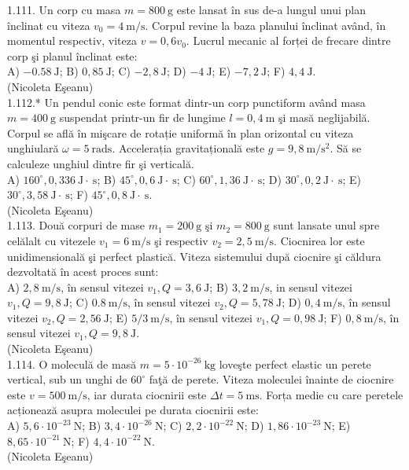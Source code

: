 1.111. Un corp cu masa $m=800 \mathrm{~g}$ este lansat în sus de-a lungul unui plan înclinat cu viteza $v_{0}=4 \mathrm{~m} / \mathrm{s}$. Corpul revine la baza planului înclinat având, în momentul respectiv, viteza $v=0,6 v_{0}$. Lucrul mecanic al forței de frecare dintre corp şi planul înclinat este:\\ A) $-0.58 \mathrm{~J}$; B) $0,85 \mathrm{~J}$; C) $-2,8 \mathrm{~J}$; D) $-4 \mathrm{~J}$; E) $-7,2 \mathrm{~J}$; F) $4,4 \mathrm{~J}$.\\ (Nicoleta Eşeanu)\\

1.112.* Un pendul conic este format dintr-un corp punctiform având masa $m=400 \mathrm{~g}$ suspendat printr-un fir de lungime $l=0,4 \mathrm{~m}$ şi masă neglijabilă. Corpul se află în mişcare de rotație uniformă în plan orizontal cu viteza unghiulară $\omega=5 \mathrm{~rads}$. Accelerația gravitațională este $g=9,8 \mathrm{~m} / \mathrm{s}^{2}$. Să se calculeze unghiul dintre fir şi verticală.\\ A) $160^{\circ}, 0,336 \mathrm{~J} \cdot \mathrm{~s}$; B) $45^{\circ}, 0,6 \mathrm{~J} \cdot \mathrm{~s}$; C) $60^{\circ}, 1,36 \mathrm{~J} \cdot \mathrm{~s}$; D) $30^{\circ}, 0,2 \mathrm{~J} \cdot \mathrm{~s}$; E) $30^{\circ}, 3,58 \mathrm{~J} \cdot \mathrm{~s}$; F) $45^{\circ}, 0,8 \mathrm{~J} \cdot \mathrm{~s}$.\\ (Nicoleta Eşeanu)\\

1.113. Două corpuri de mase $m_{1}=200 \mathrm{~g}$ şi $m_{2}=800 \mathrm{~g}$ sunt lansate unul spre celălalt cu vitezele $v_{1}=6 \mathrm{~m} / \mathrm{s}$ şi respectiv $v_{2}=2,5 \mathrm{~m} / \mathrm{s}$. Ciocnirea lor este unidimensională şi perfect plastică. Viteza sistemului după ciocnire şi căldura dezvoltată în acest proces sunt:\\ A) $2,8 \mathrm{~m} / \mathrm{s}$, în sensul vitezei $v_{1}, Q=3,6 \mathrm{~J}$; B) $3,2 \mathrm{~m} / \mathrm{s}$, in sensul vitezei $v_{1}, Q=9,8 \mathrm{~J}$; C) $0.8 \mathrm{~m} / \mathrm{s}$, în sensul vitezei $v_{2}, Q=5,78 \mathrm{~J}$; D) $0,4 \mathrm{~m} / \mathrm{s}$, în sensul vitezei $v_{2}, Q=2,56 \mathrm{~J}$; E) $5 / 3 \mathrm{~m} / \mathrm{s}$, în sensul vitezei $v_{1}, Q=0,98 \mathrm{~J}$; F) $0,8 \mathrm{~m} / \mathrm{s}$, în sensul vitezei $v_{1}, Q=9,8 \mathrm{~J}$. \\ (Nicoleta Eşeanu)\\

1.114. O moleculă de masă $m=5 \cdot 10^{-26} \mathrm{~kg}$ loveşte perfect elastic un perete vertical, sub un unghi de $60^{\circ}$ faţă de perete. Viteza moleculei înainte de ciocnire este $v=500 \mathrm{~m} / \mathrm{s}$, iar durata ciocnirii este $\Delta t=5 \mathrm{~ms}$. Forța medie cu care peretele acționează asupra moleculei pe durata ciocnirii este:\\ A) $5,6 \cdot 10^{-23} \mathrm{~N}$; B) $3,4 \cdot 10^{-26} \mathrm{~N}$; C) $2,2 \cdot 10^{-22} \mathrm{~N}$; D) $1,86 \cdot 10^{-23} \mathrm{~N}$; E) $8,65 \cdot 10^{-21} \mathrm{~N}$; F) $4,4 \cdot 10^{-22} \mathrm{~N}$.\\ (Nicoleta Eşeanu)\\

